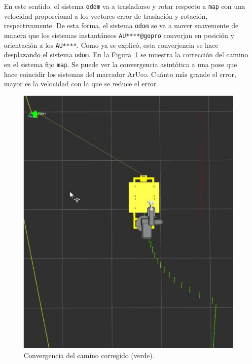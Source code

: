 \documentclass[12pt, a4paper]{report}
\begin{document}
		En este sentido, el sistema \texttt{odom} va a trasladarse y rotar respecto a \texttt{map} con una velocidad proporcional a los vectores error de traslación y rotación, respectivamente.
		De esta forma, el sistema \texttt{odom} se va a mover suavemente de manera que los sistemas instantáneos \texttt{AU****@gopro} converjan en posición y orientación a los \texttt{AU****}.
		Como ya se explicó, esta converjencia se hace desplazando el sistema \texttt{odom}.
		En la Figura~\ref{fig:resultados-convergencia} se muestra la corrección del camino en el sistema fijo \texttt{map}.
		Se puede ver la convergencia asintótica a una pose que hace coincidir los sistemas del marcador ArUco.
		Cuánto más grande el error, mayor es la velocidad con la que se reduce el error.

		\begin{figure}[H]
			\centering
			\includegraphics[width=1\linewidth]{img/Captura desde 2024-02-28 11-05-30}
			\caption{Convergencia del camino corregido (verde).}
			\label{fig:resultados-convergencia}
		\end{figure}
\end{document}
